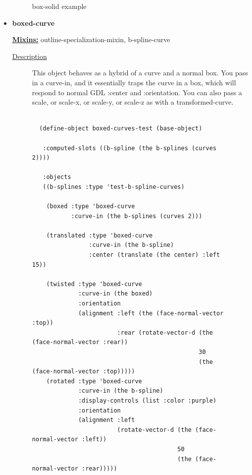 \documentclass [11pt]{book}
\begin{document}
\begin{itemize}
\begin{figure}
\caption{box-solid example}

\label{fig:box-solid}

\end{figure}






\item {}
\label{prim:boxed-curve}
\textbf{boxed-curve}


\textbf{
\underline{Mixins:}} outline-specialization-mixin, b-spline-curve





\begin{description}

\item [
\underline{Description}]


This object behaves as a hybrid of a curve 
and a normal box. You pass in a curve-in, and it essentially traps the curve 
in a box, which will respond to normal GDL :center and :orientation. 
You can also pass a scale, or scale-x, or scale-y, or scale-z as with
a transformed-curve.



\end{description}




\begin{figure}
\begin{lrbox}{\boxedverb}
\begin{minipage}{\linewidth}
{\small

\begin{verbatim}

  (define-object boxed-curves-test (base-object)
  
   :computed-slots ((b-spline (the b-splines (curves 2))))
  
   :objects
   ((b-splines :type 'test-b-spline-curves)
    
    (boxed :type 'boxed-curve
           :curve-in (the b-splines (curves 2)))
    
    (translated :type 'boxed-curve
                :curve-in (the b-spline)
                :center (translate (the center) :left 15))
    
    (twisted :type 'boxed-curve
             :curve-in (the boxed)
             :orientation 
             (alignment :left (the (face-normal-vector :top))
                        :rear (rotate-vector-d (the (face-normal-vector :rear))
                                               30
                                               (the (face-normal-vector :top)))))
    (rotated :type 'boxed-curve
             :curve-in (the b-spline)
             :display-controls (list :color :purple)
             :orientation 
             (alignment :left 
                        (rotate-vector-d (the (face-normal-vector :left))
                                         50
                                         (the (face-normal-vector :rear)))))
   

\end{verbatim}}
\end{minipage}
\end{lrbox}
\end{figure}
\end{itemize}
\end{document}
